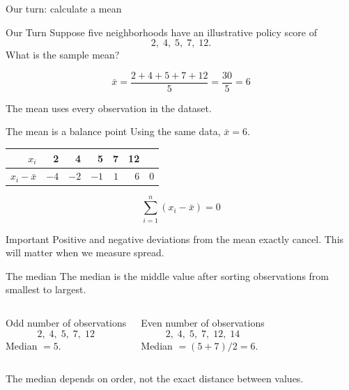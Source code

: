 \documentclass[11pt,aspectratio=169]{beamer}
\newcommand{\ourturn}[1]{%
\begin{center}
\begin{minipage}{0.90\textwidth}
\begin{block}{Our Turn}
#1
\end{block}
\end{minipage}
\end{center}}
\begin{document}
\begin{frame}{Our turn: calculate a mean}
\ourturn{Suppose five neighborhoods have an illustrative policy score of
\[
2,\;4,\;5,\;7,\;12.
\]
What is the sample mean?}

\[
\bar{x}=\frac{2+4+5+7+12}{5}=\frac{30}{5}=\boxed{6}
\]

\vfill
\alert{The mean uses every observation in the dataset.}
\end{frame}

\begin{frame}{The mean is a balance point}
Using the same data, $\bar{x}=6$.

\begin{center}
\renewcommand{\arraystretch}{1.25}
\begin{tabular}{r|rrrrr|r}
$x_i$ & 2 & 4 & 5 & 7 & 12 & \\
\midrule
$x_i-\bar{x}$ & $-4$ & $-2$ & $-1$ & $1$ & $6$ & $0$ \\
\end{tabular}
\end{center}

\vspace{0.8em}
\[
\sum_{i=1}^{n}(x_i-\bar{x})=0
\]

\vfill
\begin{alertblock}{Important}
Positive and negative deviations from the mean exactly cancel. This will matter when we measure spread.
\end{alertblock}
\end{frame}

\begin{frame}{The median}
The \alert{median} is the middle value after sorting observations from smallest to largest.

\vspace{0.5em}
\begin{columns}[T,onlytextwidth]
\begin{block}{Odd number of observations}
\[
2,\;4,\;\boxed{5},\;7,\;12
\]
Median $=5$.
\end{block}
\begin{block}{Even number of observations}
\[
2,\;4,\;\boxed{5,\;7},\;12,\;14
\]
Median $=(5+7)/2=6$.
\end{block}
\end{columns}

\vfill
\alert{The median depends on order, not the exact distance between values.}
\end{frame}
\end{document}
